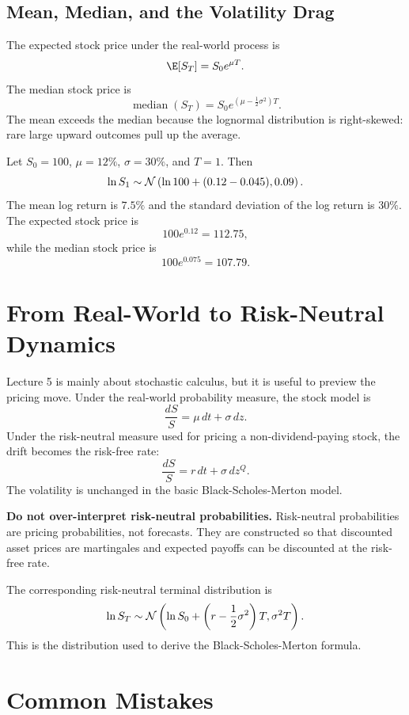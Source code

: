 \subsection{Mean, Median, and the Volatility Drag}

The expected stock price under the real-world process is
\[
    \E[S_T]=S_0e^{\mu T}.
\]
The median stock price is
\[
    \operatorname{median}(S_T)
    =
    S_0e^{(\mu-\frac{1}{2}\sigma^2)T}.
\]
The mean exceeds the median because the lognormal distribution is right-skewed:
rare large upward outcomes pull up the average.

\begin{exmp}
Let $S_0=100$, $\mu=12\%$, $\sigma=30\%$, and $T=1$. Then
\[
    \ln S_1
    \sim
    \mathcal{N}\left(
        \ln 100+(0.12-0.045),0.09
    \right).
\]
The mean log return is $7.5\%$ and the standard deviation of the log return is
$30\%$. The expected stock price is
\[
    100e^{0.12}=112.75,
\]
while the median stock price is
\[
    100e^{0.075}=107.79.
\]
\end{exmp}

\section{From Real-World to Risk-Neutral Dynamics}

Lecture 5 is mainly about stochastic calculus, but it is useful to preview the
pricing move. Under the real-world probability measure, the stock model is
\[
    \frac{dS}{S}=\mu\,dt+\sigma\,dz.
\]
Under the risk-neutral measure used for pricing a non-dividend-paying stock,
the drift becomes the risk-free rate:
\[
    \frac{dS}{S}=r\,dt+\sigma\,dz^{Q}.
\]
The volatility is unchanged in the basic Black-Scholes-Merton model.

\begin{boxD}
\textbf{Do not over-interpret risk-neutral probabilities.} Risk-neutral
probabilities are pricing probabilities, not forecasts. They are constructed so
that discounted asset prices are martingales and expected payoffs can be
discounted at the risk-free rate.
\end{boxD}

The corresponding risk-neutral terminal distribution is
\[
    \ln S_T
    \sim
    \mathcal{N}\left(
        \ln S_0+\left(r-\frac{1}{2}\sigma^2\right)T,
        \sigma^2T
    \right).
\]
This is the distribution used to derive the Black-Scholes-Merton formula.

\section{Common Mistakes}

